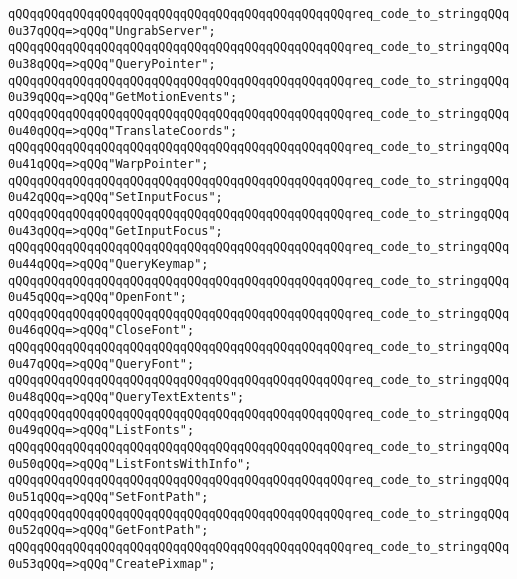 \verb|qQQqqQQqqQQqqQQqqQQqqQQqqQQqqQQqqQQqqQQqqQQqqQQqreq_code_to_stringqQQq0u37qQQq=>qQQq"UngrabServer";|\newline
\verb|qQQqqQQqqQQqqQQqqQQqqQQqqQQqqQQqqQQqqQQqqQQqqQQqreq_code_to_stringqQQq0u38qQQq=>qQQq"QueryPointer";|\newline
\verb|qQQqqQQqqQQqqQQqqQQqqQQqqQQqqQQqqQQqqQQqqQQqqQQqreq_code_to_stringqQQq0u39qQQq=>qQQq"GetMotionEvents";|\newline
\verb|qQQqqQQqqQQqqQQqqQQqqQQqqQQqqQQqqQQqqQQqqQQqqQQqreq_code_to_stringqQQq0u40qQQq=>qQQq"TranslateCoords";|\newline
\verb|qQQqqQQqqQQqqQQqqQQqqQQqqQQqqQQqqQQqqQQqqQQqqQQqreq_code_to_stringqQQq0u41qQQq=>qQQq"WarpPointer";|\newline
\verb|qQQqqQQqqQQqqQQqqQQqqQQqqQQqqQQqqQQqqQQqqQQqqQQqreq_code_to_stringqQQq0u42qQQq=>qQQq"SetInputFocus";|\newline
\verb|qQQqqQQqqQQqqQQqqQQqqQQqqQQqqQQqqQQqqQQqqQQqqQQqreq_code_to_stringqQQq0u43qQQq=>qQQq"GetInputFocus";|\newline
\verb|qQQqqQQqqQQqqQQqqQQqqQQqqQQqqQQqqQQqqQQqqQQqqQQqreq_code_to_stringqQQq0u44qQQq=>qQQq"QueryKeymap";|\newline
\verb|qQQqqQQqqQQqqQQqqQQqqQQqqQQqqQQqqQQqqQQqqQQqqQQqreq_code_to_stringqQQq0u45qQQq=>qQQq"OpenFont";|\newline
\verb|qQQqqQQqqQQqqQQqqQQqqQQqqQQqqQQqqQQqqQQqqQQqqQQqreq_code_to_stringqQQq0u46qQQq=>qQQq"CloseFont";|\newline
\verb|qQQqqQQqqQQqqQQqqQQqqQQqqQQqqQQqqQQqqQQqqQQqqQQqreq_code_to_stringqQQq0u47qQQq=>qQQq"QueryFont";|\newline
\verb|qQQqqQQqqQQqqQQqqQQqqQQqqQQqqQQqqQQqqQQqqQQqqQQqreq_code_to_stringqQQq0u48qQQq=>qQQq"QueryTextExtents";|\newline
\verb|qQQqqQQqqQQqqQQqqQQqqQQqqQQqqQQqqQQqqQQqqQQqqQQqreq_code_to_stringqQQq0u49qQQq=>qQQq"ListFonts";|\newline
\verb|qQQqqQQqqQQqqQQqqQQqqQQqqQQqqQQqqQQqqQQqqQQqqQQqreq_code_to_stringqQQq0u50qQQq=>qQQq"ListFontsWithInfo";|\newline
\verb|qQQqqQQqqQQqqQQqqQQqqQQqqQQqqQQqqQQqqQQqqQQqqQQqreq_code_to_stringqQQq0u51qQQq=>qQQq"SetFontPath";|\newline
\verb|qQQqqQQqqQQqqQQqqQQqqQQqqQQqqQQqqQQqqQQqqQQqqQQqreq_code_to_stringqQQq0u52qQQq=>qQQq"GetFontPath";|\newline
\verb|qQQqqQQqqQQqqQQqqQQqqQQqqQQqqQQqqQQqqQQqqQQqqQQqreq_code_to_stringqQQq0u53qQQq=>qQQq"CreatePixmap";|\newline
